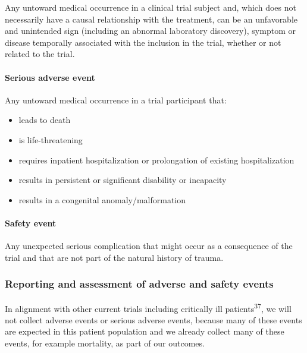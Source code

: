 \documentclass[
]{scrartcl}
\let\oldparagraph\paragraph
\renewcommand{\paragraph}[1]{\oldparagraph{#1}\mbox{}}
\providecommand{\tightlist}{%
  \setlength{\itemsep}{0pt}\setlength{\parskip}{0pt}}\usepackage{longtable,booktabs,array}
\begin{document}
Any untoward medical occurrence in a clinical trial subject and, which
does not necessarily have a causal relationship with the treatment, can
be an unfavorable and unintended sign (including an abnormal laboratory
discovery), symptom or disease temporally associated with the inclusion
in the trial, whether or not related to the trial.

\hypertarget{serious-adverse-event}{%
\paragraph{Serious adverse event}\label{serious-adverse-event}}

Any untoward medical occurrence in a trial participant that:

\begin{itemize}
\tightlist
\item
  leads to death
\item
  is life-threatening
\item
  requires inpatient hospitalization or prolongation of existing
  hospitalization
\item
  results in persistent or significant disability or incapacity
\item
  results in a congenital anomaly/malformation
\end{itemize}

\hypertarget{safety-event}{%
\paragraph{Safety event}\label{safety-event}}

Any unexpected serious complication that might occur as a consequence of
the trial and that are not part of the natural history of trauma.

\hypertarget{reporting-and-assessment-of-adverse-and-safety-events}{%
\subsubsection{Reporting and assessment of adverse and safety
events}\label{reporting-and-assessment-of-adverse-and-safety-events}}

In alignment with other current trials including critically ill
patients\textsuperscript{37}, we will not collect adverse events or
serious adverse events, because many of these events are expected in
this patient population and we already collect many of these events, for
example mortality, as part of our outcomes.
\end{document}
